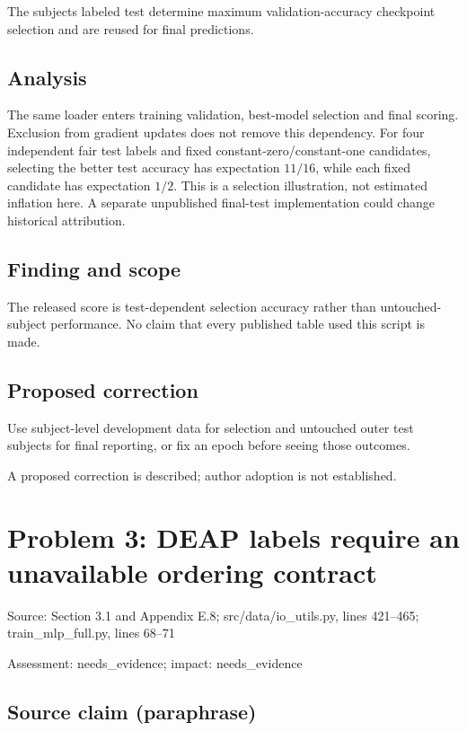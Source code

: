 \documentclass[11pt]{article}
\begin{document}
The subjects labeled test determine maximum validation-accuracy checkpoint selection and are reused for final predictions.

\subsection*{Analysis}

The same loader enters training validation, best-model selection and final scoring. Exclusion from gradient updates does not remove this dependency. For four independent fair test labels and fixed constant-zero/constant-one candidates, selecting the better test accuracy has expectation \(11/16\), while each fixed candidate has expectation \(1/2\). This is a selection illustration, not estimated inflation here. A separate unpublished final-test implementation could change historical attribution.

\subsection*{Finding and scope}

The released score is test-dependent selection accuracy rather than untouched-subject performance. No claim that every published table used this script is made.

\subsection*{Proposed correction}

Use subject-level development data for selection and untouched outer test subjects for final reporting, or fix an epoch before seeing those outcomes.

A proposed correction is described; author adoption is not established.

\section*{Problem 3: DEAP labels require an unavailable ordering contract}

Source: Section 3.1 and Appendix E.8; src/data/io\_utils.py, lines 421–465; train\_mlp\_full.py, lines 68–71

Assessment: needs\_evidence; impact: needs\_evidence

\subsection*{Source claim (paraphrase)}
\end{document}
